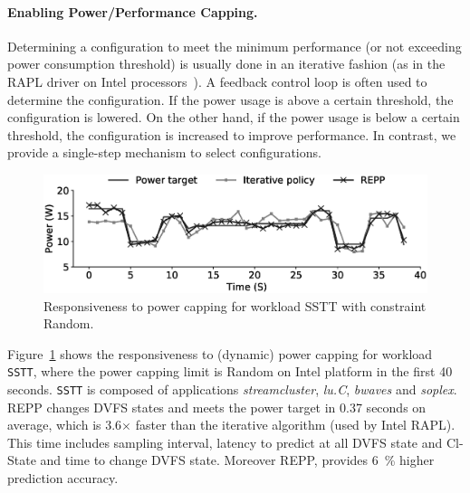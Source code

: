 
\paragraph{Enabling Power/Performance Capping.} Determining a configuration to meet the
minimum performance (or not exceeding power consumption threshold) is usually done in an
iterative fashion (as in the RAPL driver on Intel processors~\citep{Intel}). A feedback
control loop is often used to determine the  configuration. If the power usage is above a
certain threshold, the configuration is lowered. On the other hand, if the power usage is
below a certain threshold, the configuration is increased to improve performance. In
contrast, we provide a single-step mechanism to select configurations.

\begin{figure}[t]
    \centering
    \includegraphics[width=\textwidth]{Chapter3/Figs/runtime/intel-runtime.eps}
    \caption[Responsiveness to power change on Intel]{ Responsiveness to power capping for workload SSTT with constraint Random.}
    \label{fig: SSTT}
\end{figure}

Figure~\ref{fig: SSTT} shows the responsiveness to (dynamic) power capping for workload
\texttt{SSTT}, where the power capping limit is Random on Intel platform in the first 40
seconds. \texttt{SSTT} is composed of applications \emph{streamcluster}, \emph{lu.C},
\emph{bwaves} and \emph{soplex}. REPP changes DVFS states and meets the power target in
0.37 seconds on average, which is 3.6$\times$  faster than the iterative algorithm (used
by Intel RAPL). This time includes sampling interval, latency to predict at all DVFS state
and Cl-State and time to change DVFS state.  Moreover REPP, provides \SI{6}{\percent}
higher prediction accuracy. 

